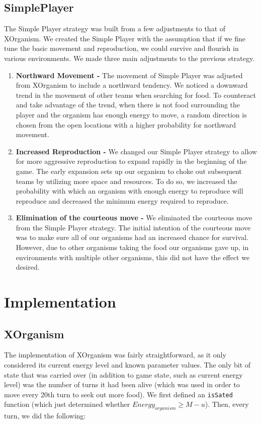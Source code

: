 \documentclass[
10pt, %
letterpaper, %
oneside, %
headinclude,footinclude, %
english
]{article}
\begin{document}
\subsection{SimplePlayer}

The Simple Player strategy was built from a few adjustments to that of XOrganism. We created the Simple Player with the assumption that if we fine tune the basic movement and reproduction, we could survive and flourish in various environments. We made three main adjustments to the previous strategy.

\begin{enumerate}
  \item \textbf{Northward Movement -} The movement of Simple Player was adjusted from XOrganism to include a northward tendency. We noticed a downward trend in the movement of other teams when searching for food. To counteract and take advantage of the trend, when there is not food surrounding the player and the organism has enough energy to move, a random direction is chosen from the open locations with a higher probability for northward movement.
  \item \textbf{Increased Reproduction -} We changed our Simple Player strategy to allow for more aggressive reproduction to expand rapidly in the beginning of the game. The early expansion sets up our organism to choke out subsequent teams by utilizing more space and resources. To do so, we increased the probability with which an organism with enough energy to reproduce will reproduce and decreased the minimum energy required to reproduce.
  \item \textbf{Elimination of the courteous move -} We eliminated the courteous move from the Simple Player strategy. The initial intention of the courteous move was to make sure all of our organisms had an increased chance for survival. However, due to other organisms taking the food our organisms gave up, in environments with multiple other organisms, this did not have the effect we desired.
\end{enumerate}

\section{Implementation}

\subsection{XOrganism}

The implementation of XOrganism was fairly straightforward, as it only considered its current energy level and known parameter values. The only bit of state that was carried over (in addition to game state, such as current energy level) was the number of turns it had been alive (which was used in order to move every 20th turn to seek out more food). We first defined an \texttt{isSated} function (which just determined whether $Energy_{organism} \geq M - u$). Then, every turn, we did the following:
\end{document}
